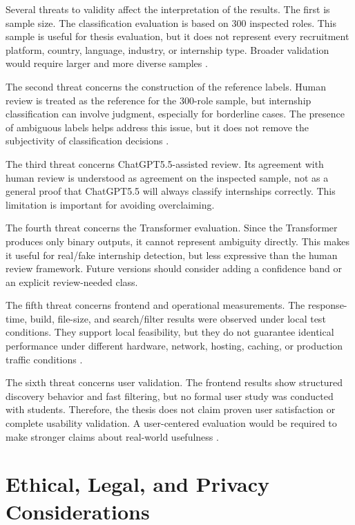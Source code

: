 Several threats to validity affect the interpretation of the results. The first is sample size.
The classification evaluation is based on 300 inspected roles. This sample is useful for thesis
evaluation, but it does not represent every recruitment platform, country, language, industry,
or internship type. Broader validation would require larger and more diverse samples \cite{wohlin2012experimentation}.

The second threat concerns the construction of the reference labels. Human review is treated
as the reference for the 300-role sample, but internship classification can involve judgment,
especially for borderline cases. The presence of ambiguous labels helps address this issue, but
it does not remove the subjectivity of classification decisions \cite{krippendorff2004content}.

The third threat concerns ChatGPT5.5-assisted review. Its agreement with human review
is understood as agreement on the inspected sample, not as a general proof that
ChatGPT5.5 will always classify internships correctly. This limitation is important for
avoiding overclaiming.

The fourth threat concerns the Transformer evaluation. Since the Transformer produces only
binary outputs, it cannot represent ambiguity directly. This makes it useful for real/fake
internship detection, but less expressive than the human review framework. Future versions
should consider adding a confidence band or an explicit review-needed class.

The fifth threat concerns frontend and operational measurements. The response-time, build,
file-size, and search/filter results were observed under local test conditions. They support
local feasibility, but they do not guarantee identical performance under different hardware,
network, hosting, caching, or production traffic conditions \cite{jain1991art}.

The sixth threat concerns user validation. The frontend results show structured discovery
behavior and fast filtering, but no formal user study was conducted with students. Therefore,
the thesis does not claim proven user satisfaction or complete usability validation. A
user-centered evaluation would be required to make stronger claims about real-world
usefulness \cite{wohlin2012experimentation}.



\section{Ethical, Legal, and Privacy Considerations}

